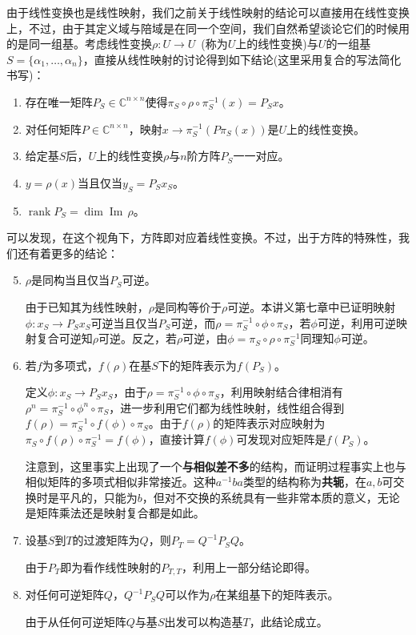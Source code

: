 \documentclass[a4paper,UTF8,fontset=windows]{ctexart}
\DeclareMathOperator{\rank}{rank}
\DeclareMathOperator{\im}{Im\,}
\newcommand*{\note}{\noindent *}
\begin{document}
由于线性变换也是线性映射，我们之前关于线性映射的结论可以直接用在线性变换上，不过，由于其定义域与陪域是在同一个空间，我们自然希望谈论它们的时候用的是同一组基。考虑线性变换$\rho:U\to U$\ (称为$U$上的线性变换)与$U$的一组基$S=\{\alpha_1,\dots,\alpha_n\}$，直接从线性映射的讨论得到如下结论(这里采用复合的写法简化书写)：
\begin{enumerate}
    \item 存在唯一矩阵$P_S\in\mathbb{C}^{n\times n}$使得$\pi_S\circ\rho\circ\pi_S^{-1}(x)=P_Sx$。
    
    \item 对任何矩阵$P\in\mathbb{C}^{n\times n}$，映射$x\to\pi_S^{-1}(P\pi_S(x))$是$U$上的线性变换。
    
    \item 给定基$S$后，$U$上的线性变换$\rho$与$n$阶方阵$P_S$一一对应。
    
    \item $y=\rho(x)$当且仅当$y_S=P_Sx_S$。
    
    \item $\rank P_S=\dim\im\rho$。
\end{enumerate}

可以发现，在这个视角下，方阵即对应着线性变换。不过，出于方阵的特殊性，我们还有着更多的结论：
\begin{enumerate}
    \setcounter{enumi}{4}
    \item $\rho$是同构当且仅当$P_S$可逆。
    
    由于已知其为线性映射，$\rho$是同构等价于$\rho$可逆。本讲义第七章中已证明映射$\phi:x_S\to P_Sx_S$可逆当且仅当$P_S$可逆，而$\rho=\pi_S^{-1}\circ\phi\circ\pi_S$，若$\phi$可逆，利用可逆映射复合可逆知$\rho$可逆。反之，若$\rho$可逆，由$\phi=\pi_S\circ\rho\circ\pi_S^{-1}$同理知$\phi$可逆。

    \item 若$f$为多项式，$f(\rho)$在基$S$下的矩阵表示为$f(P_S)$。
    
    定义$\phi:x_S\to P_Sx_S$，由于$\rho=\pi_S^{-1}\circ\phi\circ\pi_S$，利用映射结合律相消有$\rho^n=\pi_S^{-1}\circ\phi^n\circ\pi_S$，进一步利用它们都为线性映射，线性组合得到$f(\rho)=\pi_S^{-1}\circ f(\phi)\circ\pi_S$。由于$f(\rho)$的矩阵表示对应映射为$\pi_S\circ f(\rho)\circ\pi_S^{-1}=f(\phi)$，直接计算$f(\phi)$可发现对应矩阵是$f(P_S)$。

    \note 注意到，这里事实上出现了一个\textbf{与相似差不多}的结构，而证明过程事实上也与相似矩阵的多项式相似非常接近。这种$a^{-1}ba$类型的结构称为\textbf{共轭}，在$a,b$可交换时是平凡的，只能为$b$，但对不交换的系统具有一些非常本质的意义，无论是矩阵乘法还是映射复合都是如此。
    
    \item 设基$S$到$T$的过渡矩阵为$Q$，则$P_T=Q^{-1}P_SQ$。
    
    由于$P_T$即为看作线性映射的$P_{T,T}$，利用上一部分结论即得。

    \item 对任何可逆矩阵$Q$，$Q^{-1}P_SQ$可以作为$\rho$在某组基下的矩阵表示。
    
    由于从任何可逆矩阵$Q$与基$S$出发可以构造基$T$，此结论成立。
\end{enumerate}
\end{document}
